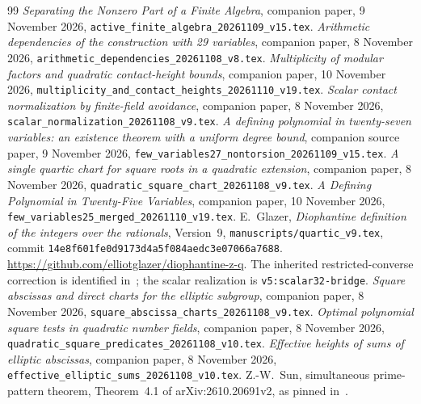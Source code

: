 \documentclass[11pt,a4paper]{article}
\begin{document}
\begin{thebibliography}{99}
\emph{Separating the Nonzero Part of a Finite Algebra},
companion paper, 9 November 2026,
\nolinkurl{active_finite_algebra_20261109_v15.tex}.
\emph{Arithmetic dependencies of the construction with 29 variables},
companion paper, 8 November 2026,
\nolinkurl{arithmetic_dependencies_20261108_v8.tex}.
\emph{Multiplicity of modular factors and quadratic contact-height bounds},
companion paper, 10 November 2026,
\nolinkurl{multiplicity_and_contact_heights_20261110_v19.tex}.
\emph{Scalar contact normalization by finite-field avoidance},
companion paper, 8 November 2026,
\nolinkurl{scalar_normalization_20261108_v9.tex}.
\emph{A defining polynomial in twenty-seven variables:
an existence theorem with a uniform degree bound},
companion source paper, 9 November 2026,
\nolinkurl{few_variables27_nontorsion_20261109_v15.tex}.
\emph{A single quartic chart for square roots in a quadratic extension},
companion paper, 8 November 2026,
\nolinkurl{quadratic_square_chart_20261108_v9.tex}.
\emph{A Defining Polynomial in Twenty-Five Variables},
companion paper, 10 November 2026,
\nolinkurl{few_variables25_merged_20261110_v19.tex}.
E.~Glazer, \emph{Diophantine definition of the integers over the
rationals}, Version~9, \nolinkurl{manuscripts/quartic_v9.tex},
commit \nolinkurl{14e8f601fe0d9173d4a5f084aedc3e07066a7688}.
\url{https://github.com/elliotglazer/diophantine-z-q}.
The inherited restricted-converse correction is identified
in~\cite{Dependencies}; the scalar realization is
\nolinkurl{v5:scalar32-bridge}.
\emph{Square abscissas and direct charts for the elliptic subgroup},
companion paper, 8 November 2026,
\nolinkurl{square_abscissa_charts_20261108_v9.tex}.
\emph{Optimal polynomial square tests in quadratic number fields},
companion paper, 8 November 2026,
\nolinkurl{quadratic_square_predicates_20261108_v10.tex}.
\emph{Effective heights of sums of elliptic abscissas},
companion paper, 8 November 2026,
\nolinkurl{effective_elliptic_sums_20261108_v10.tex}.
Z.-W.~Sun, simultaneous prime-pattern theorem,
Theorem~4.1 of arXiv:2610.20691v2, as pinned in~\cite{Dependencies}.
\end{thebibliography}
\end{document}
